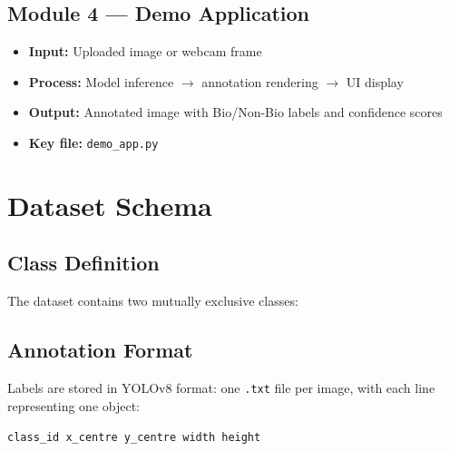 \subsection{Module 4 — Demo Application}

\begin{itemize}
    \item \textbf{Input:} Uploaded image or webcam frame
    \item \textbf{Process:} Model inference $\rightarrow$ annotation rendering $\rightarrow$ UI display
    \item \textbf{Output:} Annotated image with Bio/Non-Bio labels and confidence scores
    \item \textbf{Key file:} \texttt{demo\_app.py}
\end{itemize}

\section{Dataset Schema}

\subsection{Class Definition}

The dataset contains two mutually exclusive classes:

\begin{table}[H]
\centering
\caption{Dataset Class Definitions}
\label{tab:classes}
\end{table}

\subsection{Annotation Format}

Labels are stored in YOLOv8 format: one \texttt{.txt} file per image, with each line representing one object:

\begin{center}
\texttt{class\_id  x\_centre  y\_centre  width  height}
\end{center}

